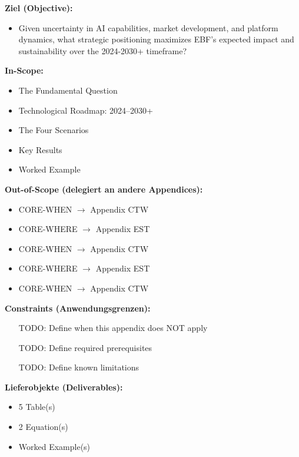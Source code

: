 \begin{tcolorbox}[
    colback=orange!5!white,
    colframe=orange!75!black,
    title={\textbf{Appendix Scope: Ziel / In-Scope / Out-of-Scope / Constraints}},
    fonttitle=\bfseries
]

\textbf{Ziel (Objective):}
\begin{itemize}[nosep]
    \item Given uncertainty in AI capabilities, market development, and platform
dynamics, what strategic positioning maximizes EBF's expected impact and
sustainability over the 2024-2030+ timeframe?
\end{itemize}

\textbf{In-Scope:}
\begin{itemize}[nosep]
    \item The Fundamental Question
    \item Technological Roadmap: 2024--2030+
    \item The Four Scenarios
    \item Key Results
    \item Worked Example
\end{itemize}

\textbf{Out-of-Scope (delegiert an andere Appendices):}
\begin{itemize}[nosep]
    \item CORE-WHEN $\rightarrow$ Appendix CTW
    \item CORE-WHERE $\rightarrow$ Appendix EST
    \item CORE-WHEN $\rightarrow$ Appendix CTW
    \item CORE-WHERE $\rightarrow$ Appendix EST
    \item CORE-WHEN $\rightarrow$ Appendix CTW
\end{itemize}

\textbf{Constraints (Anwendungsgrenzen):}
\begin{itemize}[nosep]
    \item [TODO: Define when this appendix does NOT apply]
    \item [TODO: Define required prerequisites]
    \item [TODO: Define known limitations]
\end{itemize}

\textbf{Lieferobjekte (Deliverables):}
\begin{itemize}[nosep]
    \item 5 Table(s)
    \item 2 Equation(s)
    \item Worked Example(s)
\end{itemize}

\end{tcolorbox}


